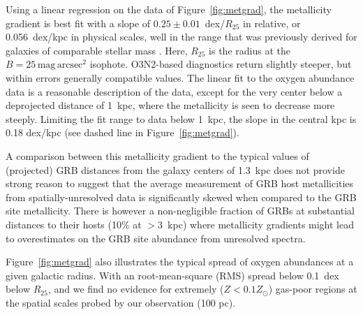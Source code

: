 \documentclass[traditabstract]{aa}
\newcommand{\hii}{\mbox{H\,{\sc ii}}}
\begin{document}

Using a linear regression on the data of Figure~\ref{fig:metgrad}, the metallicity gradient is best fit with a slope of $0.25\pm0.01$~dex/$R_{25}$ in relative, or 0.056~dex/kpc in physical scales, well in the range that was previously derived for galaxies of comparable stellar mass \citep{2015MNRAS.448.2030H, }. Here, $R_{25}$ is the radius at the $B=25\,\mathrm{mag}\,\mathrm{arcsec}^2$ isophote. O3N2-based diagnostics return slightly steeper, but within errors generally compatible values. The linear fit to the oxygen abundance data is a reasonable description of the data, except for the very center below a deprojected distance of 1~kpc, where the metallicity is seen to decrease more steeply. Limiting the fit range to data below 1~kpc, the slope in the central kpc is 0.18 dex/kpc (see dashed line in Figure~\ref{fig:metgrad}). 

A comparison between this metallicity gradient to the typical values of (projected) GRB distances from the galaxy centers of 1.3~kpc \citep{2016ApJ...817..144B} does not provide strong reason to suggest that the average measurement of GRB host metallicities from spatially-unresolved data is significantly skewed when compared to the GRB site metallicity. There is however a non-negligible fraction of GRBs at substantial distances to their hosts (10\% at $>3$~kpc) where metallicity gradients might lead to overestimates on the GRB site abundance from unresolved spectra.

Figure~\ref{fig:metgrad} also illustrates the typical spread of oxygen abundances at a given galactic radius. With an root-mean-square (RMS) spread below 0.1~dex below $R_{25}$, and we find no evidence for extremely ($Z < 0.1 Z_\odot$) gas-poor regions at the spatial scales probed by our observation (100 pc). 
\end{document}
